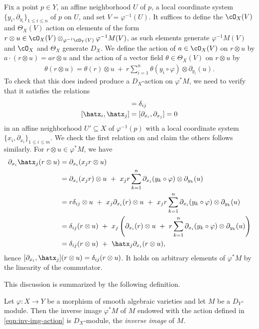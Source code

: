 Fix a point $p \in Y$, an affine neighborhood $U$ of $p$, a local coordinate system $\{y_i,\partial_{y_i}\}_{1\leq i\leq n}$ of $p$ on $U$, and set $V = \varphi^{-1}(U)$. It suffices to define the $\cO_X(V)$ and $\Theta_X(V)$ action on elements of the form $r \otimes u \in \cO_X(V) \otimes_{\varphi^{-1}\cO_Y(V)} \varphi^{-1}M(V)$, as such elements generate $\varphi^{-1}M(V)$ and $\cO_X$ and $\Theta_X$ generate $D_X$. We define the action of $a \in \cO_X(V)$ on $r\otimes u$ by $a\cdot (r\otimes u) = ar\otimes u$ and the action of a vector field $\theta \in \Theta_X(V)$ on $r \otimes u$ by
\begin{align*}\label{eqn:inv-img-action}\tag{$\ast$}
	\theta(r \otimes u) = \theta(r)\otimes u ~+~ r\sum_{i=1}^n \theta(y_i \circ \varphi) \otimes \partial_{y_i}(u).
\end{align*}
To check that this does indeed produce a $D_X$-action on $\varphi^*M$, we need to verify that it satisfies the relations
\begin{align*}
	[\partial_{x_i},\hatx_j] &= \delta_{ij} \\
	[\hatx_i,\hatx_j] &= [\partial_{x_i},\partial_{x_j}] = 0
\end{align*}
in an affine neighborhood $U'\subseteq X$ of $\varphi^{-1}(p)$ with a local coordinate system $\{x_i,\partial_{x_i}\}_{1\leq i\leq m}$. We check the first relation on and claim the others follows similarly. For $r\otimes u \in \varphi^*M$, we have
\begin{align*}
	\partial_{x_i}\hatx_j(r\otimes u) 
		&= \partial_{x_i}(x_jr\otimes u) \\
		&= \partial_{x_i}(x_jr) \otimes u ~+~ x_jr\sum_{k=1}^n \partial_{x_i}(y_k \circ \varphi)\otimes \partial_{y_k}(u) \\
		&= r\delta_{ij}\otimes u ~+~ x_j \partial_{x_i}(r)\otimes u ~+~ x_jr\sum_{k=1}^n \partial_{x_i}(y_k \circ \varphi)\otimes \partial_{y_k}(u) \\
		&= \delta_{ij}(r\otimes u) ~+~ x_j\left(\partial_{x_i}(r) \otimes u ~+~ r\sum_{k=1}^n \partial_{x_i}(y_k \circ \varphi)\otimes \partial_{y_k}(u)\right) \\
		&= \delta_{ij}(r\otimes u) ~+~ \hatx_j\partial_{x_i}(r\otimes u),
\end{align*}
hence $[\partial_{x_i}, \hatx_j](r\otimes u) = \delta_{ij}(r\otimes u)$. It holds on arbitrary elements of $\varphi^*M$ by the linearity of the commutator.

This discussion is summarized by the following definition.
\begin{defn}\label{defn:inv-img}
	Let $\varphi:X\to Y$ be a morphism of smooth algebraic varieties and let $M$ be a $D_Y$-module. Then the inverse image $\varphi^*M$ of $M$ endowed with the action defined in \ref{eqn:inv-img-action} is $D_X$-module, the \emph{inverse image} of $M$.
\end{defn}

